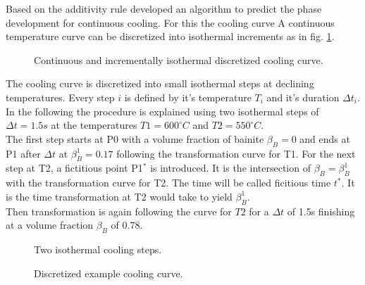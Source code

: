 Based on the additivity rule \cite{tzitzelkov_mathematische_1974} developed an algorithm to predict the phase development for continuous cooling. 
For this the cooling curve 
A continuous temperature curve can be discretized into isothermal increments as in fig. \ref{fig:discCoolCurve}. 

\begin{figure}[h]%
\centering
{} 
\caption{Continuous and incrementally isothermal discretized cooling curve.}
\label{fig:discCoolCurve}
\end{figure}



The cooling curve is discretized into small isothermal steps at declining temperatures. Every step $i$ is defined by it's temperature $T_i$ and it's duration $\Delta t_i$. \\
In the following the procedure is explained using two isothermal steps of $\Delta t = 1.5s$ at the temperatures  $T1 = 600^\circ C$ and $T2 = 550^\circ C$. \\ 
The first step starts at P0 with a volume fraction of bainite 
$\beta_B = 0$ and ends at P1 after $\Delta t$ at $\beta_B^1 = 0.17$ following the transformation curve for T1.  
For the next step at T2, a fictitious point P1$^\ast$ is introduced. It is the intersection of $\beta_B = \beta_B^1$ with the transformation curve for T2. The time will be called ficitious time $t^\ast$. It is the time transformation at T2 would take to yield $\beta_B^1$.\\
Then transformation is again  following the curve for $T2$ for a $\Delta t$ of 1.5s finishing at a volume fraction $\beta_B$ of 0.78. \\


\begin{figure}[h]
\centering
{} %
\caption{Two isothermal cooling steps.}
\label{fig:ficTime}
\end{figure}

\begin{figure}[h]
\centering
{} 
\caption{Discretized example cooling curve.}
\label{fig:discTt}
\end{figure}

\begin{figure}[h]
\centering
{} %
\caption{}
\label{fig:}
\end{figure}



